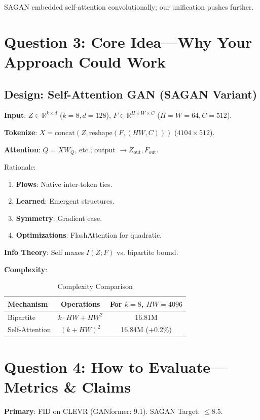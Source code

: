 \documentclass[12pt,a4paper]{article}
\begin{document}
SAGAN embedded self-attention convolutionally; our unification pushes further.

\section{Question 3: Core Idea—Why Your Approach Could Work}

\subsection{Design: Self-Attention GAN (SAGAN Variant)}

\textbf{Input}: $Z\in\mathbb{R}^{k\times d}$ ($k=8,d=128$), $F\in\mathbb{R}^{H\times W\times C}$ ($H=W=64,C=512$).

\textbf{Tokenize}: $X=\text{concat}(Z,\text{reshape}(F,(HW,C)))$ ($4104\times512$).

\textbf{Attention}: $Q=XW_Q$, etc.; output $\to Z_\text{out},F_\text{out}$.

Rationale:
\begin{enumerate}
    \item \textbf{Flows}: Native inter-token ties.
    \item \textbf{Learned}: Emergent structures.
    \item \textbf{Symmetry}: Gradient ease.
    \item \textbf{Optimizations}: FlashAttention for quadratic.
\end{enumerate}

\textbf{Info Theory}: Self maxes $I(Z;F)$ vs. bipartite bound.

\textbf{Complexity}:
\begin{table}[H]
\centering
\caption{Complexity Comparison}
\begin{tabular}{lcc}
\toprule
Mechanism & Operations & For $k=8$, $HW=4096$ \\
\midrule
Bipartite & $k\cdot HW + HW^2$ & 16.81M \\
Self-Attention & $(k + HW)^2$ & 16.84M (+0.2\%) \\
\bottomrule
\end{tabular}
\end{table}

\section{Question 4: How to Evaluate—Metrics \& Claims}

\textbf{Primary}: FID on CLEVR (GANformer: 9.1). SAGAN Target: $\leq$8.5.
\end{document}
